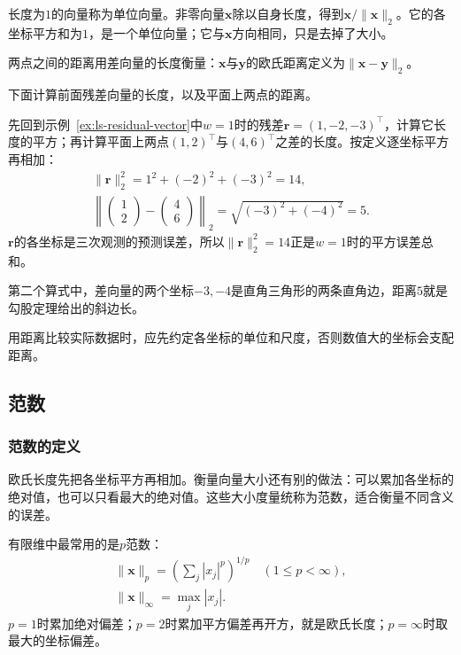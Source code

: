 长度为$1$的向量称为单位向量。非零向量$\bm x$除以自身长度，得到$\bm x/\lVert\bm x\rVert_2$。它的各坐标平方和为$1$，是一个单位向量；它与$\bm x$方向相同，只是去掉了大小。

两点之间的距离用差向量的长度衡量：$\bm x$与$\bm y$的欧氏距离定义为$\lVert\bm x-\bm y\rVert_2$。

下面计算前面残差向量的长度，以及平面上两点的距离。
\begin{example}[长度与距离的计算]
\label{ex:ls-length-distance}
先回到示例~\ref{ex:ls-residual-vector}中$w=1$时的残差$\bm r=(1,-2,-3)^\top$，计算它长度的平方；再计算平面上两点$(1,2)^\top$与$(4,6)^\top$之差的长度。按定义逐坐标平方再相加：
\[
 \begin{gathered}
 \lVert\bm r\rVert_2^2=1^2+(-2)^2+(-3)^2=14,\\
 \left\lVert\begin{pmatrix}1\\2\end{pmatrix}-\begin{pmatrix}4\\6\end{pmatrix}\right\rVert_2=\sqrt{(-3)^2+(-4)^2}=5.
 \end{gathered}
\]
$\bm r$的各坐标是三次观测的预测误差，所以$\lVert\bm r\rVert_2^2=14$正是$w=1$时的平方误差总和。

第二个算式中，差向量的两个坐标$-3,-4$是直角三角形的两条直角边，距离$5$就是勾股定理给出的斜边长。
\end{example}
用距离比较实际数据时，应先约定各坐标的单位和尺度，否则数值大的坐标会支配距离。

\subsection{范数}
\label{sec:ls-coordinate-norms}

\subsubsection{范数的定义}

欧氏长度先把各坐标平方再相加。衡量向量大小还有别的做法：可以累加各坐标的绝对值，也可以只看最大的绝对值。这些大小度量统称为范数，适合衡量不同含义的误差。

有限维中最常用的是$p$范数：
\begin{equation}
 \begin{gathered}
 \lVert\bm x\rVert_p=\left(\sum_j|x_j|^p\right)^{1/p}\quad(1\leq p<\infty),
 \\
 \lVert\bm x\rVert_\infty=\max_j|x_j|.
 \end{gathered}
 \label{eq:ls-p-norm}
\end{equation}
$p=1$时累加绝对偏差；$p=2$时累加平方偏差再开方，就是欧氏长度；$p=\infty$时取最大的坐标偏差。

